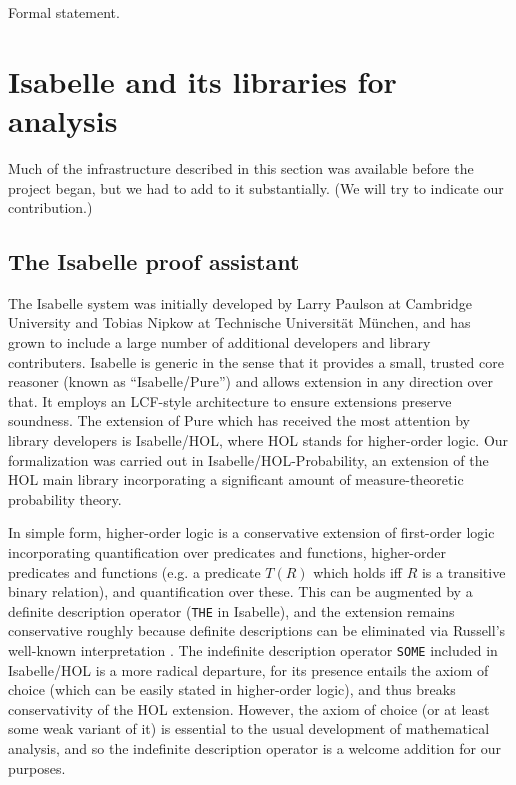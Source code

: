\documentclass{svjour3}
\begin{document}
Formal statement.

\section{Isabelle and its libraries for analysis}
\label{section:isabelle}

Much of the infrastructure described in this section was available before the project began, but we had to add to it substantially. (We will try to indicate our contribution.)

\subsection{The Isabelle proof assistant}

The Isabelle system was initially developed by Larry Paulson at Cambridge University and Tobias Nipkow at Technische Universit\"at M\"unchen, and has grown to include a large number of additional developers and library contributers. Isabelle is generic in the sense that it provides a small, trusted core reasoner (known as ``Isabelle/Pure'') and allows extension in any direction over that. It employs an LCF-style architecture \cite{gordon-lcf} to ensure extensions preserve soundness. The extension of Pure which has received the most attention by library developers is Isabelle/HOL, where HOL stands for higher-order logic. Our formalization was carried out in Isabelle/HOL-Probability, an extension of the HOL main library incorporating a significant amount of measure-theoretic probability theory.

In simple form, higher-order logic is a conservative extension of first-order logic incorporating quantification over predicates and functions, higher-order predicates and functions (e.g. a predicate $T(R)$ which holds iff $R$ is a transitive binary relation), and quantification over these. This can be augmented by a definite description operator (\texttt{THE} in Isabelle), and the extension remains conservative roughly because definite descriptions can be eliminated via Russell's well-known interpretation \cite{russell-knowledge-acquaintance-description}. The indefinite description operator \texttt{SOME} included in Isabelle/HOL is a more radical departure, for its presence entails the axiom of choice (which can be easily stated in higher-order logic), and thus breaks conservativity of the HOL extension. However, the axiom of choice (or at least some weak variant of it) is essential to the usual development of mathematical analysis, and so the indefinite description operator is a welcome addition for our purposes.
\end{document}
